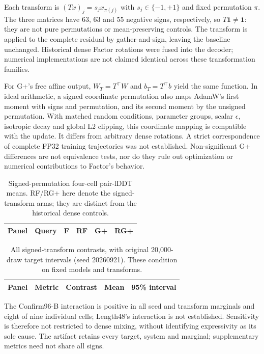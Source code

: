 Each transform is $(Tx)_j=s_jx_{\pi(j)}$ with $s_j\in\{-1,+1\}$ and fixed
permutation $\pi$. The three matrices have 63, 63 and 55 negative signs,
respectively, so $T\mathbf1\ne\mathbf1$: they are not pure permutations or
mean-preserving controls. The transform is applied to the complete residual
by gather-and-sign, leaving the baseline unchanged. Historical dense Factor
rotations were fused into the decoder; numerical implementations are not
claimed identical across these transformation families.

For G+'s free affine output, $W_T=T^\top W$ and $b_T=T^\top b$ yield the same
function. In ideal arithmetic, a signed coordinate permutation also maps
AdamW's first moment with signs and permutation, and its second moment by the
unsigned permutation. With matched random conditions, parameter groups, scalar
$\epsilon$, isotropic decay and global L2 clipping, this coordinate mapping is
compatible with the update. It differs from arbitrary dense rotations.
A strict correspondence of complete FP32 training trajectories was not
established. Non-significant G+ differences are not equivalence tests, nor do
they rule out optimization or numerical contributions to Factor's behavior.

\begin{table}[htbp]\centering\small
\caption{Signed-permutation four-cell pair-lDDT means. RF/RG+ here denote the
signed-transform arms; they are distinct from the historical dense controls.}
\begin{tabular}{lrrrrr}\toprule
Panel & Query & F & RF & G+ & RG+ \\\midrule

\end{tabular}\end{table}

\begin{table}[htbp]\centering\small
\caption{All signed-transform contrasts, with original 20,000-draw target
intervals (seed 20260921). These condition on fixed models and transforms.}
\begin{tabular}{lllll}\toprule
Panel & Metric & Contrast & Mean & 95\% interval \\\midrule

\end{tabular}\end{table}

The Confirm96-B interaction is positive in all seed and transform marginals
and eight of nine individual cells; Length48's interaction is not established.
Sensitivity is therefore not restricted to dense mixing, without identifying
expressivity as its sole cause. The artifact retains every target, system and
marginal; supplementary metrics need not share all signs.

